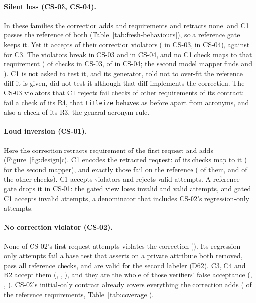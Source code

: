 \paragraph{Silent loss (CS-03, CS-04).} In these families the correction adds  and  requirements and retracts none, and C1 passes the reference of both (Table~\ref{tab:fresh-behaviours}), so a reference gate keeps it. Yet it accepts  of their correction violators ( in CS-03,  in CS-04), against  for C3. The violators break  in CS-03 and  in CS-04, and no C1 check maps to that requirement ( of  checks in CS-03,  of  in CS-04; the second model mapper finds  and ). C1 is not asked to test it, and its generator, told not to over-fit the reference diff it is given, did not test it although that diff implements the correction. The  CS-03 violators that C1 rejects fail checks of other requirements of its contract:  fail a check of its R4, that \texttt{titleize} behaves as before apart from acronyms, and  also a check of its R3, the general acronym rule.

\paragraph{Loud inversion (CS-01).} Here the correction retracts  requirement of the first request and adds  (Figure~\ref{fig:design}c). C1 encodes the retracted request:  of its  checks map to it ( for the second mapper), and exactly those fail on the reference ( of them, and  of the other checks). C1 accepts  violators and rejects  valid attempts. A reference gate drops it in CS-01: the gated view loses  invalid and  valid attempts, and gated C1 accepts  invalid attempts, a denominator that includes CS-02's  regression-only attempts.

\paragraph{No correction violator (CS-02).} None of CS-02's first-request attempts violates the correction (). Its  regression-only attempts fail a base test that asserts on a private attribute both removed, pass all  reference checks, and are valid for the second labeler (D62). C3, C4 and B2 accept them (, , ), and they are the whole of those verifiers' false acceptance (, , ). CS-02's initial-only contract already covers everything the correction adds ( of the reference requirements, Table~\ref{tab:coverage}).


